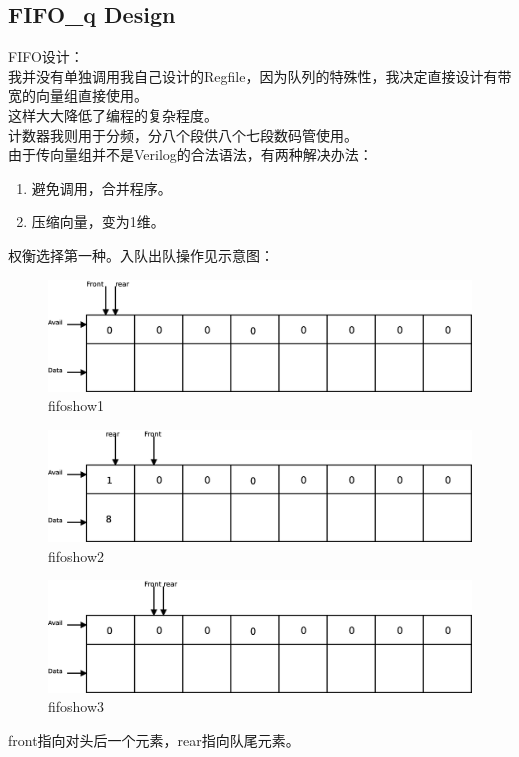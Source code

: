 \documentclass[12pt, a4paper]{article}
\begin{document}
\subsection{FIFO\_q Design}
FIFO设计：\\
我并没有单独调用我自己设计的Regfile，因为队列的特殊性，我决定直接设计有带宽的向量组直接使用。\\
这样大大降低了编程的复杂程度。\\
计数器我则用于分频，分八个段供八个七段数码管使用。\\
由于传向量组并不是Verilog的合法语法，有两种解决办法：
\begin{enumerate}
	\item 避免调用，合并程序。
	\item 压缩向量，变为1维。
\end{enumerate}
权衡选择第一种。入队出队操作见示意图：\\
\begin{figure}[H]
\centering
\includegraphics[width=0.9\linewidth]{FIFOshow1}
\caption{fifoshow1}
\label{fig:fifoshow1}
\end{figure}
\begin{figure}[H]
\centering
\includegraphics[width=0.9\linewidth]{FIFOshow2}
\caption{fifoshow2}
\label{fig:fifoshow2}
\end{figure}
\begin{figure}[H]
\centering
\includegraphics[width=0.9\linewidth]{FIFOshow3}
\caption{fifoshow3}
\label{fig:fifoshow3}
\end{figure}
front指向对头后一个元素，rear指向队尾元素。
\clearpage
\end{document}
